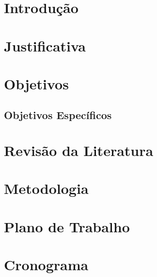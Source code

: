\documentclass[a4paper,10pt]{article}
\begin{document}
	
	
\section{Introdução}

\section{Justificativa}

\section{Objetivos}
\subsection{Objetivos Específicos}

\section{Revisão da Literatura}

\section{Metodologia}

\section{Plano de Trabalho}

\section{Cronograma}

	
	
	
\end{document}
